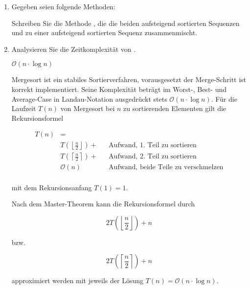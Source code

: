 \documentclass{bschlangaul-aufgabe}
\begin{document}
\begin{enumerate}


\item Gegeben seien folgende Methoden:


Schreiben Sie die Methode ,
die die beiden aufsteigend sortierten Sequenzen  und  zu
einer aufsteigend sortierten Sequenz zusammenmischt.

\begin{bAntwort}
\end{bAntwort}


\item Analysieren Sie die Zeitkomplexität von .

\begin{bAntwort}
$\mathcal{O}(n \cdot \log n)$


Mergesort ist ein stabiles Sortierverfahren, vorausgesetzt der
Merge-Schritt ist korrekt implementiert. Seine Komplexität beträgt im
Worst-, Best- und Average-Case in Landau-Notation ausgedrückt stets $\mathcal{O}(n
\cdot \log n)$. Für die Laufzeit $T(n)$ von Mergesort bei $n$ zu
sortierenden Elementen gilt die Rekursionsformel

\begin{align*}
T(n) & = \\
     & T\left(\left\lfloor\frac{n}{2}\right\rfloor\right) + && \text{Aufwand, 1. Teil zu sortieren}\\
     & T\left(\left\lceil\frac{n}{2}\right\rceil\right) + && \text{Aufwand, 2. Teil zu sortieren}\\
     & \mathcal{O}(n) && \text{Aufwand, beide Teile zu verschmelzen}\\
\end{align*}

mit dem Rekursionsanfang $T(1) = 1$.

Nach dem Master-Theorem kann die Rekursionsformel durch

\begin{displaymath}
2T\left(\left\lfloor\frac{n}{2}\right\rfloor\right) + n
\end{displaymath}

bzw.

\begin{displaymath}
2T\left(\left\lceil\frac{n}{2}\right\rceil\right) + n
\end{displaymath}

approximiert werden mit jeweils der Lösung $T(n) = \mathcal{O}(n \cdot \log n)$.
\end{bAntwort}

\end{enumerate}
\end{document}
